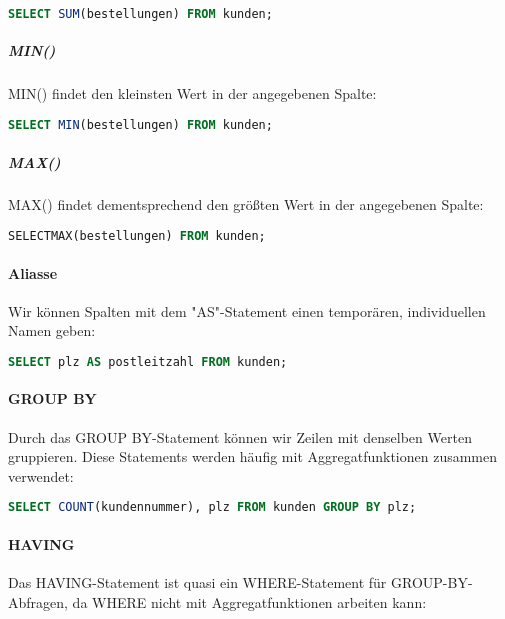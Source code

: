 \documentclass{article}
\begin{document}
	\begin{lstlisting}[language=SQL, caption=Anzahl der Bestellungen aller Kunden]
	SELECT SUM(bestellungen) FROM kunden;
	\end{lstlisting}

	\subparagraph{MIN()}
	MIN() findet den kleinsten Wert in der angegebenen Spalte:

	\begin{lstlisting}[language=SQL, caption=Kleinste Anzahl an Bestellungen eines Kunden]
	SELECT MIN(bestellungen) FROM kunden;
	\end{lstlisting}

	\subparagraph{MAX()}
	MAX() findet dementsprechend den größten Wert in der angegebenen Spalte:

	\begin{lstlisting}[language=SQL, caption=Einzelner Kunde mit den meisten Bestellungen]
	SELECTMAX(bestellungen) FROM kunden;
	\end{lstlisting}

	\paragraph{Aliasse}
	Wir können Spalten mit dem "AS"-Statement einen temporären, individuellen Namen geben:

	\begin{lstlisting}[language=SQL, caption=Benennt die Spalte "plz" in "postleitzahl" um]
	SELECT plz AS postleitzahl FROM kunden;
	\end{lstlisting}

	\paragraph{GROUP BY}
	Durch das GROUP BY-Statement können wir Zeilen mit denselben Werten gruppieren. Diese Statements werden häufig mit Aggregatfunktionen zusammen verwendet:

	\begin{lstlisting}[language=SQL, caption=Nennt die Zahl der Kunden in den einzelnen Orten]
	SELECT COUNT(kundennummer), plz FROM kunden GROUP BY plz;
	\end{lstlisting}

	\paragraph{HAVING}
	Das HAVING-Statement ist quasi ein WHERE-Statement für GROUP-BY-Abfragen, da WHERE nicht mit Aggregatfunktionen arbeiten kann:
\end{document}

